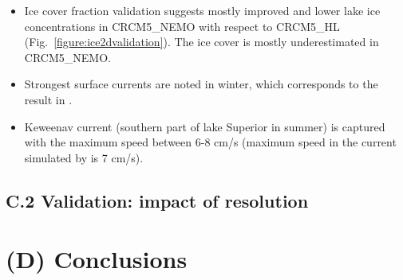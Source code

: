 \documentclass[a0b,landscape]{a0poster}
\begin{document}
\begin{multicols*}{4}
\begin{itemize}
  \item Ice cover fraction validation suggests mostly improved and lower lake ice concentrations in CRCM5\_NEMO with respect to CRCM5\_HL (Fig.~\ref{figure:ice2dvalidation}).
  The ice cover is mostly underestimated in CRCM5\_NEMO.

\end{itemize}




\noindent
{}
\begin{itemize}
  \item Strongest surface currents are noted in winter, which corresponds to the result in \citet{dupont2012}.
  \item Keweenav current (southern part of lake Superior in summer) is captured with the maximum speed
  between 6-8 cm/s (maximum speed in the current simulated by \citet{dupont2012} is 7 cm/s).
\end{itemize}


\subsection*{C.2 Validation: impact of resolution}



{
  \color{SaddleBrown} %

  \section*{(D) Conclusions}

}
\end{multicols*}
\end{document}
